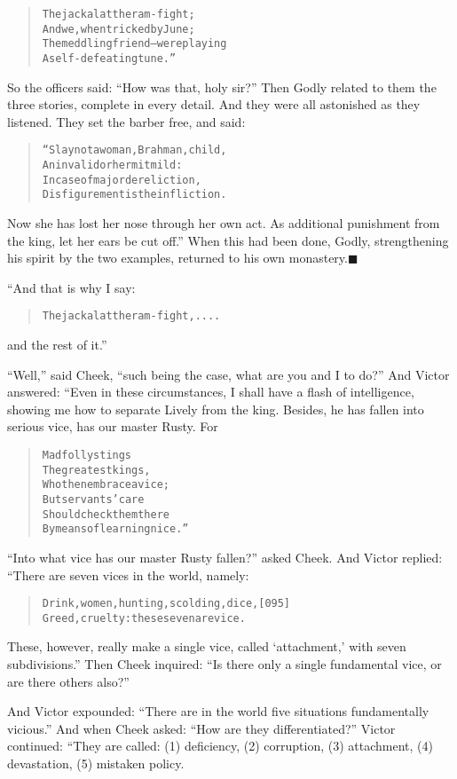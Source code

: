 \documentclass[article, twoside, 14pt]{memoir}
\newcommand{\qed}{\hfill \ensuremath{\blacksquare}}
\renewenvironment{verbatim}{%
\begin{quote}%
\vskip -10pt%
\begin{alltt}\normalfont\large}{\end{alltt}%
\end{quote}%
\vskip -10pt
} %
\begin{document}
\begin{verbatim}
The jackal at the ram-fight;
And we, when tricked by June;
The meddling friend--were playing
A self-defeating tune.”
\end{verbatim}
So the officers said: ``How was that, holy sir?'' Then Godly
related to them the three stories, complete in every detail. And
they were all astonished as they listened. They set the barber
free, and said:

\begin{verbatim}
“Slay not a woman, Brahman, child,
An invalid or hermit mild:
In case of major dereliction,
Disfigurement is the infliction.
\end{verbatim}
Now she has lost her nose through her own act. As additional
punishment from the king, let her ears be cut off.” When this had
been done, Godly, strengthening his spirit by the two examples,
returned to his own monastery.\hyperref[s7]{\qed}

“And that is why I say:

\begin{verbatim}
The jackal at the ram-fight, ....
\end{verbatim}
and the rest of it.”

``Well,'' said Cheek,
``such being the case, what are you and I to do?'' And Victor
answered: “Even in these circumstances, I shall have a flash of
intelligence, showing me how to separate Lively from the king.
Besides, he has fallen into serious vice, has our master Rusty.
For

\begin{verbatim}
Mad folly stings
The greatest kings,
    Who then embrace a vice;
But servants' care
Should check them there
    By means of learning nice.”
\end{verbatim}
``Into what vice has our master Rusty fallen?'' asked Cheek. And
Victor replied: “There are seven vices in the world, namely:

\begin{verbatim}
Drink, women, hunting, scolding, dice,                  [095]
Greed, cruelty: these seven are vice.
\end{verbatim}
These, however, really make a single vice, called `attachment,'
with seven subdivisions.” Then Cheek inquired:
``Is there only a single fundamental vice, or are there others also?''

And Victor expounded:
``There are in the world five situations fundamentally vicious.''
And when Cheek asked: ``How are they differentiated?'' Victor
continued: “They are called: (1) deficiency, (2) corruption, (3)
attachment, (4) devastation, (5) mistaken policy.
\end{document}

